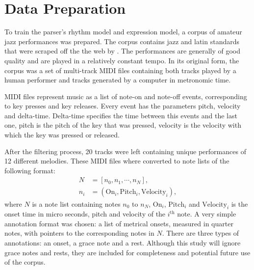 




\section{Data Preparation}
\label{sec:corpus}

To train the parser's rhythm model and expression model, a corpus of amateur jazz performances was prepared. The corpus contains jazz and latin standards that were scraped off the the web by \citet{Wild:10}. The performances are generally of good quality and are played in a relatively constant tempo. In its original form, the corpus was a set of multi-track MIDI files containing both tracks played by a human performer and tracks generated by a computer in metronomic time.

MIDI files represent music as a list of note-on and note-off events, corresponding to key presses and key releases. Every event has the parameters pitch, velocity and delta-time. Delta-time specifies the time between this events and the last one, pitch is the pitch of the key that was pressed, velocity is the velocity with which the key was pressed or released.


After the filtering process, 20 tracks were left containing unique performances of 12 different melodies. These MIDI files where converted to note lists of the following format:
\begin{align*}
N &= [n_0, n_1, \cdots, n_N],\\
n_i &= (\mathrm{On}_i, \mathrm{Pitch}_i, \mathrm{Velocity}_i),
\end{align*}
where $N$ is a note list containing notes $n_0$ to $n_N$, $\mathrm{On}_i$, $\mathrm{Pitch}_i$ and $\mathrm{Velocity}_i$ is the onset time in micro seconds, pitch and velocity of the $i^{\mathrm{th}}$ note. A very simple annotation format was chosen: a list of metrical onsets, measured in quarter notes, with pointers to the corresponding notes in $N$. There are three types of annotations: an onset, a grace note and a rest. Although this study will ignore grace notes and rests, they are included for completeness and potential future use of the corpus.

